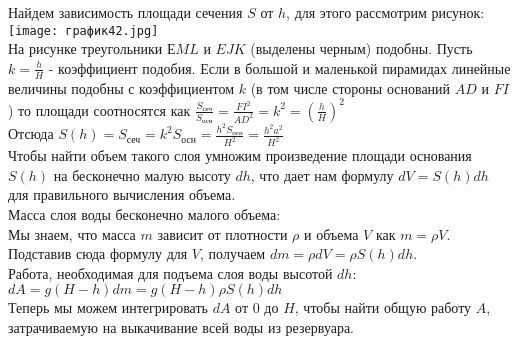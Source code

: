 \documentclass{article}
\begin{document}
Найдем зависимость площади сечения $S$ от $h$, для этого рассмотрим рисунок:\\
\texttt{[image: график42.jpg]} \\
На рисунке треугольники $ЕML$ и $EJK$ (выделены черным) подобны. Пусть $k = \frac{h}{H}$ - коэффициент подобия. Если в большой и маленькой пирамидах линейные
величины подобны с коэффициентом $k$ (в том числе стороны оснований $AD$ и
$FI$) то площади соотносятся как $\frac{S_{\text{сеч}}}{S_{\text{осн}}} = \frac{FI^2}{AD^2} = k^2 = (\frac{h}{H})^2$\\
Отсюда
$S(h) = S_{\text{сеч}} = k^2 S_{\text{осн}} = \frac{h^2 S_{\text{осн}}}{H^2} = \frac{h^2 a^2}{H^2}$\\
Чтобы найти объем такого слоя умножим произведение площади основания
$S(h)$ на бесконечно малую высоту $dh$, что дает нам формулу $dV=S(h)dh$ для
правильного вычисления объема.\\
Масса слоя воды бесконечно малого объема:\\
Мы знаем, что масса $m$ зависит от плотности $\rho$ и объема $V$ как $m=\rho V$.\\
Подставив сюда формулу для $V$, получаем $dm = \rho dV = \rho S(h)dh$.\\
Работа, необходимая для подъема слоя воды высотой $dh$:\\
$dA=g(H - h)dm=g(H - h)\rho S(h)dh$\\
Теперь мы можем интегрировать $dA$ от 0 до $H$, чтобы найти общую работу $A$,
затрачиваемую на выкачивание всей воды из резервуара.
\end{document}
